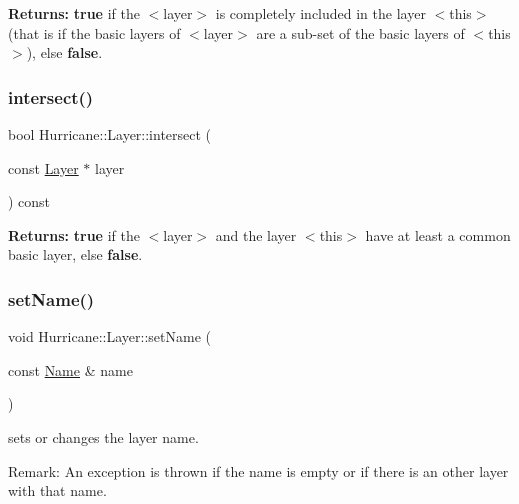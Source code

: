 {\bfseries Returns\+:} {\bfseries true} if the {\ttfamily $<$layer$>$} is completely included in the layer {\ttfamily $<$this$>$} (that is if the basic layers of {\ttfamily $<$layer$>$} are a sub-\/set of the basic layers of {\ttfamily $<$this$>$}), else {\bfseries false}. \mbox{\label{classHurricane_1_1Layer_adbea0bafaa87b033efdaa98bf2709182}} 
\subsubsection{\texorpdfstring{intersect()}{intersect()}}
{\footnotesize\ttfamily bool Hurricane\+::\+Layer\+::intersect (\begin{DoxyParamCaption}\item[{const \hyperlink{classHurricane_1_1Layer}{Layer} $\ast$}]{layer }\end{DoxyParamCaption}) const}

{\bfseries Returns\+:} {\bfseries true} if the {\ttfamily $<$layer$>$} and the layer {\ttfamily $<$this$>$} have at least a common basic layer, else {\bfseries false}. \mbox{\label{classHurricane_1_1Layer_ab93809f19bc360f58d35e91438ef2f87}} 
\subsubsection{\texorpdfstring{set\+Name()}{setName()}}
{\footnotesize\ttfamily void Hurricane\+::\+Layer\+::set\+Name (\begin{DoxyParamCaption}\item[{const \hyperlink{classHurricane_1_1Name}{Name} \&}]{name }\end{DoxyParamCaption})}

sets or changes the layer name.

\begin{DoxyParagraph}{Remark\+:}
An exception is thrown if the name is empty or if there is an other layer with that name. 
\end{DoxyParagraph}
\mbox{\label{classHurricane_1_1Layer_a400d17fe999c0080bb50489948986fe7}} 
